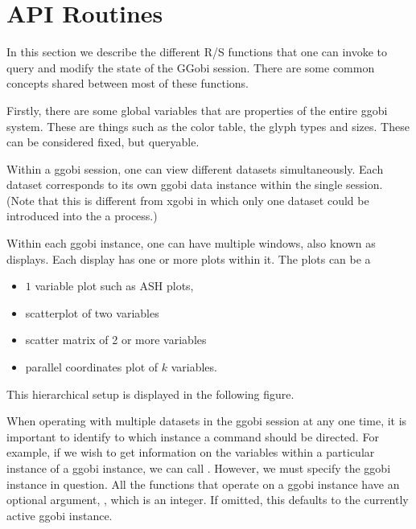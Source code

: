 \documentclass{article}
\begin{document}
\section{API Routines}
In this section  we describe the different
R/S functions that one can invoke to query
and modify the state of the GGobi session.
There are some common concepts shared between
most of these functions.

Firstly, there are some global variables that are properties of the
entire ggobi system.  These are things such as the color table, the
glyph types and sizes.  These can be considered fixed, but queryable.

Within a ggobi session, one can view different datasets
simultaneously. Each dataset corresponds to its own ggobi data
instance within the single session.  (Note that this is different from
xgobi in which only one dataset could be introduced into the a
process.)

Within each ggobi instance, one can have multiple 
windows, also known as displays.
Each display has one or more plots within it.
The plots can be a
\begin{itemize}
\item $1$ variable plot
such as ASH plots,
\item  scatterplot of two variables
\item scatter matrix of 2 or more variables
\item parallel coordinates plot of $k$ variables.
\end{itemize}

This hierarchical setup is displayed in the following
figure.
\begin{center}
\end{center}

When operating with multiple datasets in the ggobi session at any one
time, it is important to identify to which instance a command should
be directed.  For example, if we wish to get information on the
variables within a particular instance of a ggobi instance, we can
call . However, we must
specify the ggobi instance in question. All the functions
that operate on a ggobi instance have an optional argument,
, which is an integer.
If omitted, this defaults to the currently active
ggobi instance.
\end{document}
